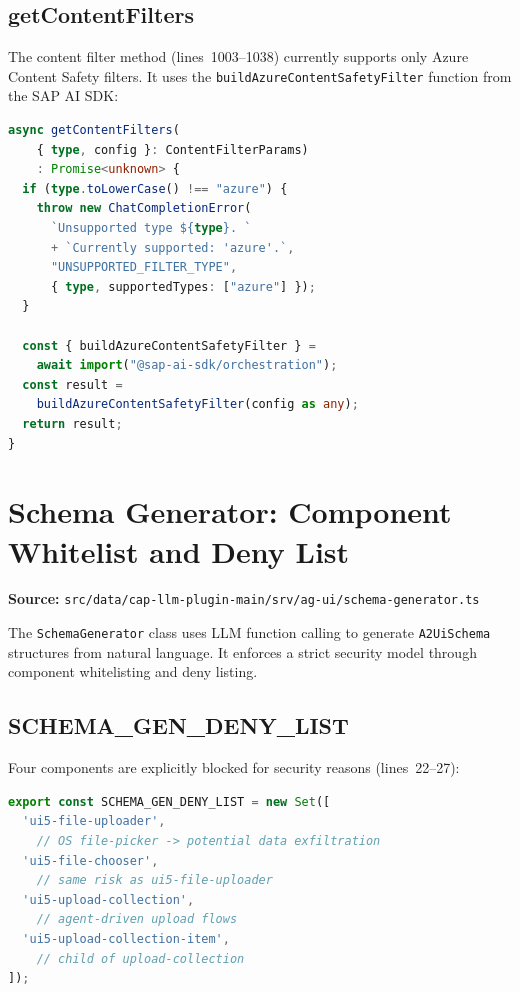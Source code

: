 \documentclass[11pt]{article}
\begin{document}
\subsection{getContentFilters}

The content filter method (lines~1003--1038) currently supports only Azure
Content Safety filters. It uses the \texttt{buildAzureContentSafetyFilter}
function from the SAP AI SDK:

\begin{lstlisting}[language=TypeScript,caption={getContentFilters (cap-llm-plugin.ts, lines 1003--1022)},firstnumber=1003]
async getContentFilters(
    { type, config }: ContentFilterParams)
    : Promise<unknown> {
  if (type.toLowerCase() !== "azure") {
    throw new ChatCompletionError(
      `Unsupported type ${type}. `
      + `Currently supported: 'azure'.`,
      "UNSUPPORTED_FILTER_TYPE",
      { type, supportedTypes: ["azure"] });
  }

  const { buildAzureContentSafetyFilter } =
    await import("@sap-ai-sdk/orchestration");
  const result =
    buildAzureContentSafetyFilter(config as any);
  return result;
}
\end{lstlisting}

\section{Schema Generator: Component Whitelist and Deny List}
\label{sec:schema-generator}

\noindent\textbf{Source:}
\texttt{src/data/cap-llm-plugin-main/srv/ag-ui/schema-generator.ts}

The \texttt{SchemaGenerator} class uses LLM function calling to generate
\texttt{A2UiSchema} structures from natural language. It enforces a strict
security model through component whitelisting and deny listing.

\subsection{SCHEMA\_GEN\_DENY\_LIST}

Four components are explicitly blocked for security reasons (lines~22--27):

\begin{lstlisting}[language=TypeScript,caption={SCHEMA\_GEN\_DENY\_LIST (schema-generator.ts, lines 22--27)},firstnumber=22]
export const SCHEMA_GEN_DENY_LIST = new Set([
  'ui5-file-uploader',
    // OS file-picker -> potential data exfiltration
  'ui5-file-chooser',
    // same risk as ui5-file-uploader
  'ui5-upload-collection',
    // agent-driven upload flows
  'ui5-upload-collection-item',
    // child of upload-collection
]);
\end{lstlisting}
\end{document}
